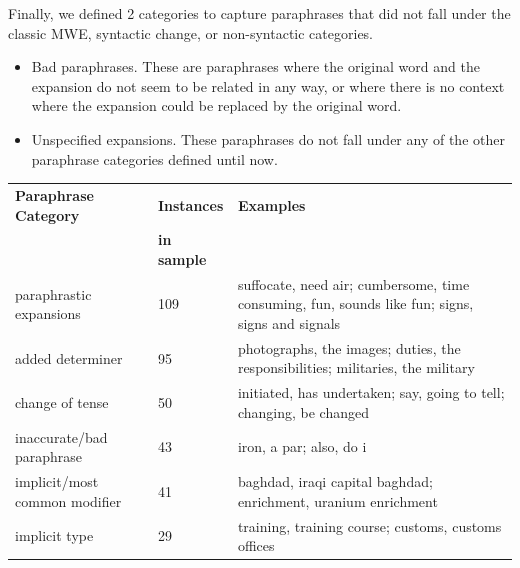 \documentclass[11pt]{article}
\begin{document}
Finally, we defined 2 categories to capture paraphrases that did not fall under the classic MWE, syntactic change, or non-syntactic categories.
\begin{itemize}
\item Bad paraphrases. These are paraphrases where the original word and the expansion do not seem to be related in any way, or where there is no context where the expansion could be replaced by the original word. 
\item Unspecified expansions. These paraphrases do not fall under any of the other paraphrase categories defined until now. 
\end{itemize}


\begin{center}
\begin{table}
\hfill{}
\begin{tabular}{|l|l|p{.5\linewidth}|}
\hline
\bf Paraphrase Category & \bf Instances & \bf Examples \\ 
 & \bf in sample & \\
\hline
paraphrastic expansions & 109 & suffocate, need air; cumbersome, time consuming, fun, sounds like fun; signs, signs and signals \\
added determiner & 95 & photographs, the images; duties, the responsibilities; militaries, the military \\
change of tense & 50 & initiated, has undertaken; say, going to tell; changing, be changed\\
inaccurate/bad paraphrase & 43 & iron, a par; also, do i\\
implicit/most common modifier & 41 & baghdad, iraqi capital baghdad; enrichment, uranium enrichment \\
implicit type & 29 & training, training course; customs, customs offices \\

\end{tabular}
\end{table}
\end{center}
\end{document}
